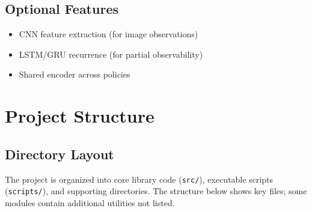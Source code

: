\documentclass[11pt]{article}
\begin{document}
\subsection{Optional Features}
\begin{itemize}
    \item CNN feature extraction (for image observations)
    \item LSTM/GRU recurrence (for partial observability)
    \item Shared encoder across policies
\end{itemize}

\section{Project Structure}

\subsection{Directory Layout}

The project is organized into core library code (\texttt{src/}), executable scripts (\texttt{scripts/}), and supporting directories. The structure below shows key files; some modules contain additional utilities not listed.
\end{document}
